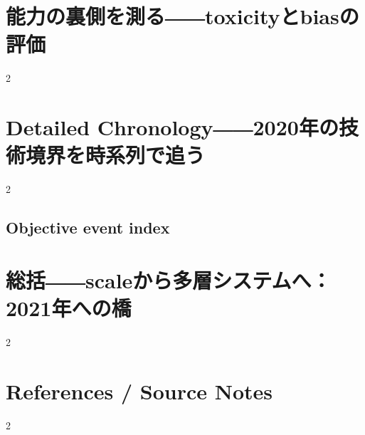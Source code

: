 \documentclass[lualatex,a4paper,11pt]{jlreq}
\begin{document}
\Needspace{0.45\textheight}
\bigskip
\section{能力の裏側を測る――toxicityとbiasの評価}
\label{pkg:evaluation-risk}
\vspace{0.15em}

\vspace{0.20em}
\begin{multicols}{2}

\end{multicols}

\medskip


\Needspace{0.45\textheight}
\bigskip
\section{Detailed Chronology――2020年の技術境界を時系列で追う}
\label{pkg:annual-chronology}
\vspace{0.15em}

\vspace{0.20em}
\begin{multicols}{2}

\end{multicols}
\medskip
\subsection*{Objective event index}

\medskip

\Needspace{0.45\textheight}
\bigskip
\section{総括――scaleから多層システムへ：2021年への橋}
\label{pkg:synthesis-transition-2021}
\vspace{0.15em}

\vspace{0.20em}
\begin{multicols}{2}

\end{multicols}
\medskip

\Needspace{0.20\textheight}
\smallskip
{}\par
\smallskip
\section*{References / Source Notes}
\begingroup
\fontsize{7pt}{8pt}\selectfont
\setlength{\bibitemsep}{0pt}
\begin{multicols}{2}
\raggedright
\printbibliography[heading=none]
\end{multicols}
\endgroup
\end{document}
